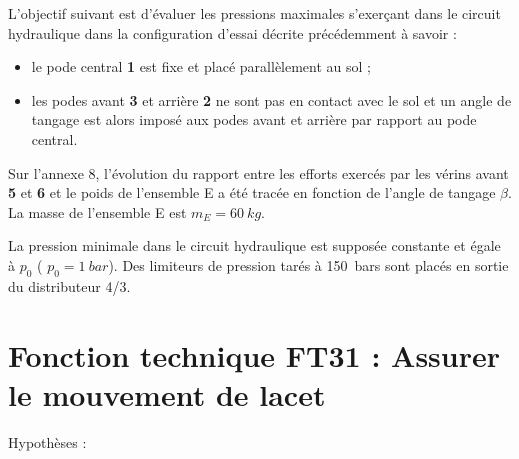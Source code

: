 

L’objectif suivant est d’évaluer les pressions maximales s’exerçant dans le circuit hydraulique dans la configuration
d’essai décrite précédemment à savoir :
\begin{itemize}
\item le pode central \textbf{1} est fixe et placé parallèlement au sol ;
\item les podes avant \textbf{3} et arrière \textbf{2} ne sont pas en contact avec le sol et un angle de tangage est alors imposé aux
podes avant et arrière par rapport au pode central.
\end{itemize}
Sur l’annexe 8, l’évolution du rapport entre les efforts exercés par les vérins avant \textbf{5} et \textbf{6} et le poids de l’ensemble E a
été tracée en fonction de l’angle de tangage $\beta$. La masse de l’ensemble E est $m_E = \SI{60}{kg}$.


La pression minimale dans le circuit hydraulique est supposée constante et égale à $p_0$ ( $p_0 = \SI{1}{bar}$). Des limiteurs de
pression tarés à \SI{150}{bars} sont placés en sortie du distributeur 4/3.


\section{Fonction technique FT31 : Assurer le mouvement de lacet}
Hypothèses :


